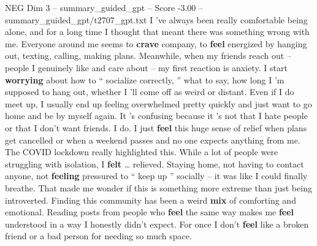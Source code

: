 \begin{textsample}{NEG Dim 3 – summary\_guided\_gpt – Score -3.00 – summary\_guided\_gpt/t2707\_gpt.txt}  \label{ex:f3_neg_024}
I ’ve always been really comfortable being alone, and for a long time I thought that meant there was something wrong with me.
Everyone around me seems to \textbf{crave} company, to \textbf{feel} energized by hanging out, texting, calling, making plans.
Meanwhile, when my friends reach out – people I genuinely like and care about – my first reaction is anxiety.
I start \textbf{worrying} about how to “ socialize correctly, ” what to say, how long I ’m supposed to hang out, whether I ’ll come off as weird or distant.
Even if I do meet up, I usually end up feeling overwhelmed pretty quickly and just want to go home and be by myself again.
It ’s confusing because it ’s not that I hate people or that I don't want friends.
I do.
I just \textbf{feel} this huge sense of relief when plans get cancelled or when a weekend passes and no one expects anything from me.
The COVID lockdown really highlighted this.
While a lot of people were struggling with isolation, I \textbf{felt} … relieved.
Staying home, not having to contact anyone, not \textbf{feeling} pressured to “ keep up ” socially – it was like I could finally breathe.
That made me wonder if this is something more extreme than just being introverted.
Finding this community has been a weird \textbf{mix} of comforting and emotional.
Reading posts from people who \textbf{feel} the same way makes me \textbf{feel} understood in a way I honestly didn't expect.
For once I don't \textbf{feel} like a broken friend or a bad person for needing so much space.

\end{textsample}
